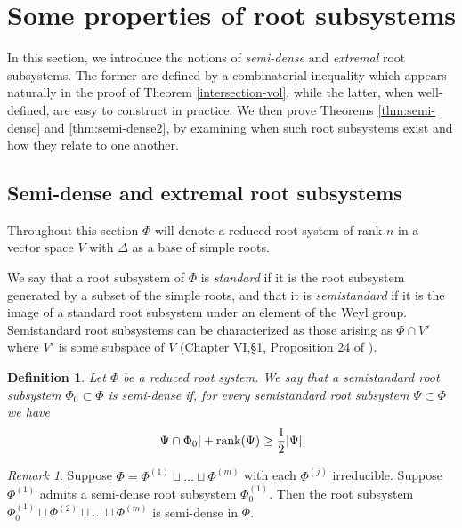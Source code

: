 \documentclass[12pt]{amsart}
\newtheorem{definition}[theorem]{Definition}
\theoremstyle{remark}
\newtheorem{remark}[theorem]{Remark}
\begin{document}
\section{Some properties of root subsystems}\label{sec:big-subsystems}

In this section, we introduce the notions of \textit{semi-dense} and \textit{extremal} root subsystems. The former are defined by a combinatorial inequality which appears naturally in the proof of Theorem \ref{intersection-vol}, while the latter, when well-defined, are easy to construct in practice. We then prove Theorems \ref{thm:semi-dense} and \ref{thm:semi-dense2}, by examining when such root subsystems exist and how they relate to one another.

\subsection{Semi-dense and extremal root subsystems}

Throughout this section $\Phi$ will denote a reduced root system of rank $n$ in a vector space $V$ with $\Delta$ as a base of simple roots.

We say that a root subsystem of $\Phi$ is \textit{standard} if it is the root subsystem generated by a subset of the simple roots, and that it is \textit{semistandard} if it is the image of a standard root subsystem under an element of the Weyl group. Semistandard root subsystems can be characterized as those arising as $\Phi \cap V'$ where $V'$ is some subspace of $V$ (Chapter VI,\S 1, Proposition 24 of \cite{Bourbaki}). 

\begin{definition}\label{def:big}
Let $\Phi$ be a reduced root system. We say that a semistandard root subsystem $\Phi_0\subset\Phi$ is {\normalfont semi-dense} if, for every semistandard root subsystem $\Psi\subset\Phi$ we have
    \begin{equation}\label{eqn_root_ineq}
        |\Psi \cap \Phi_0| + \textnormal{rank}(\Psi) \geq \frac{1}{2} |\Psi|. 
    \end{equation}
    \end{definition}

\begin{remark}
    Suppose $\Phi = \Phi^{(1)} \sqcup \dots \sqcup \Phi^{(m)}$ with each $\Phi^{(j)}$ irreducible. Suppose $\Phi^{(1)}$ admits a semi-dense root subsystem $\Phi^{(1)}_0$. Then the root subsystem $\Phi^{(1)}_0 \sqcup \Phi^{(2)} \sqcup \dots \sqcup \Phi^{(m)}$ is semi-dense in $\Phi$. 
\end{remark}
\end{document}
